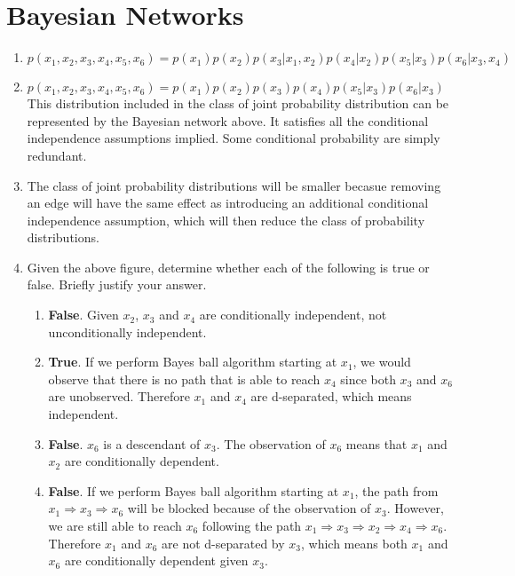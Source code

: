 \documentclass[english]{article}
\begin{document}
\section{Bayesian Networks}
\begin{enumerate}
    \item $p(x_1, x_2, x_3, x_4, x_5, x_6) = p(x_1)p(x_2)p(x_3|x_1, x_2)p(x_4|x_2)p(x_5|x_3)p(x_6|x_3, x_4)$
    \item $p(x_1, x_2, x_3, x_4, x_5, x_6) = p(x_1)p(x_2)p(x_3)p(x_4)p(x_5|x_3)p(x_6|x_3)$ This distribution included in the class of joint probability distribution can be represented by the Bayesian network above. It satisfies all the conditional independence assumptions implied. Some conditional probability are simply redundant.
    \item The class of joint probability distributions will be smaller becasue removing an edge will have the same effect as introducing an additional conditional independence assumption, which will then reduce the class of probability distributions.
    \item Given the above figure, determine whether each of the following is true or false. Briefly justify your answer.
    \begin{enumerate}
        \item \textbf{False}. Given $x_2$, $x_3$ and $x_4$ are conditionally independent, not unconditionally independent.
        \item \textbf{True}. If we perform Bayes ball algorithm starting at $x_1$, we would observe that there is no path that is able to reach $x_4$ since both $x_3$ and $x_6$ are unobserved. Therefore $x_1$ and $x_4$ are d-separated, which means independent.
        \item \textbf{False}. $x_6$ is a descendant of $x_3$. The observation of $x_6$ means that $x_1$ and $x_2$ are conditionally dependent.
        \item \textbf{False}. If we perform Bayes ball algorithm starting at $x_1$, the path from $x_1 \Rightarrow x_3 \Rightarrow x_6$ will be blocked because of the observation of $x_3$. However, we are still able to reach $x_6$ following the path $x_1 \Rightarrow x_3 \Rightarrow x_2 \Rightarrow x_4 \Rightarrow x_6$. Therefore $x_1$ and $x_6$ are not d-separated by $x_3$, which means both $x_1$ and $x_6$ are conditionally dependent given $x_3$.
    \end{enumerate}
\end{enumerate}
\clearpage
\end{document}
